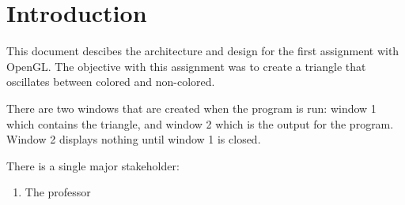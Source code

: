 \section{Introduction}
\label{section:intro}

This document descibes the architecture and design for the first assignment with OpenGL.
The objective with this assignment was to create a triangle that oscillates between colored and non-colored.

There are two windows that are created when the program is run:
window 1 which contains the triangle, and window 2 which is the output for the program.
Window 2 displays nothing until window 1 is closed.

\vspace{1cm}

There is a single major stakeholder:
\begin{enumerate}
    \item The professor
\end{enumerate}